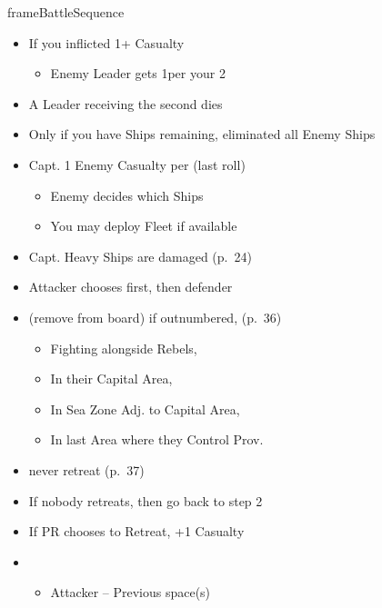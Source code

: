 \documentclass[10pt]{article}
\newlength{\fhBattleSequence} \setlength\fhBattleSequence{50\baselineskip}
\begin{document}
\begin{dynamiccontents*}{frameBattleSequence}
\begin{eubox}{\fhBattleSequence}
\begin{multicols}{2}
\begin{itemize}
\begin{itemize}
			\end{itemize}
		\end{itemize}
		\begin{itemize}
			\item If you inflicted 1+ Casualty
			\begin{itemize}
				\item Enemy Leader gets 1\illhealth per your 2\tercios
			\end{itemize}
			\item A Leader receiving the second \illhealth dies
		\end{itemize}
		\begin{itemize}
			\item Only if you have Ships remaining,  eliminated all Enemy Ships
			\item Capt. 1 Enemy Casualty per \tercios (last roll)
			\begin{itemize}
				\item Enemy decides which Ships 
				\item You may deploy Fleet if available
			\end{itemize}
			\item Capt. Heavy Ships are damaged (p.~24)
		\end{itemize}
		\begin{itemize}
			\item Attacker chooses first, then defender
			\item {} (remove from board) if outnumbered,  (p.~36)
			\begin{itemize}
				\item Fighting alongside Rebels, 
				\item In their Capital Area, 
				\item In Sea Zone Adj. to Capital Area, 
				\item In last Area where they Control Prov.
			\end{itemize}
			\item {} never retreat (p.~37)
			\item If nobody retreats, then go back to step 2
			\item If PR chooses to Retreat, +1 Casualty
			\item {}
			\begin{itemize}
				\item Attacker -- Previous space(s)

\end{itemize}
\end{itemize}
\end{multicols}
\end{eubox}
\end{dynamiccontents*}
\end{document}

